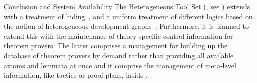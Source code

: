 \begin{omgroup}[id=maya,short=Maya,creators={autexier,hutter,mossakowski,shairer}]
\begin{omgroup}{Conclusion and System Availability}
The Heterogeneous Tool Set ({\hets}, see ) extends {\maya} with a treatment
of hiding~\cite{MAH-06-a}, and a uniform treatment of different logics based on the notion
of heterogeneous development graphs~\cite{Mossakowski:tdghb02}.  Furthermore, it is planned
to extend this with the maintenance of theory-specific control information for theorem
provers. The latter comprises a management for building up the database of theorem provers
by demand rather than providing all available axioms and lemmata at once and it comprise
the management of meta-level information, like tactics or proof plans, inside {\maya}.
\end{omgroup}
\end{omgroup}
